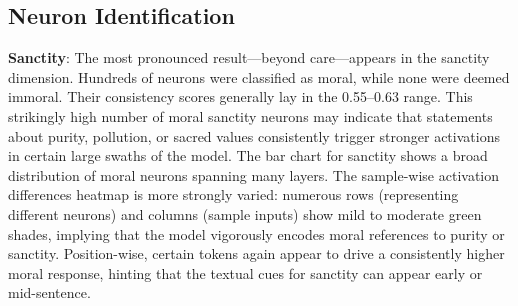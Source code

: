

\subsection{Neuron Identification}
\textbf{Sanctity}: The most pronounced result—beyond care—appears in the sanctity dimension. Hundreds of neurons were classified as moral, while none were deemed immoral. Their consistency scores generally lay in the 0.55–0.63 range. This strikingly high number of moral sanctity neurons may indicate that statements about purity, pollution, or sacred values consistently trigger stronger activations in certain large swaths of the model. The bar chart for sanctity shows a broad distribution of moral neurons spanning many layers. The sample-wise activation differences heatmap is more strongly varied: numerous rows (representing different neurons) and columns (sample inputs) show mild to moderate green shades, implying that the model vigorously encodes moral references to purity or sanctity. Position-wise, certain tokens again appear to drive a consistently higher moral response, hinting that the textual cues for sanctity can appear early or mid-sentence.

